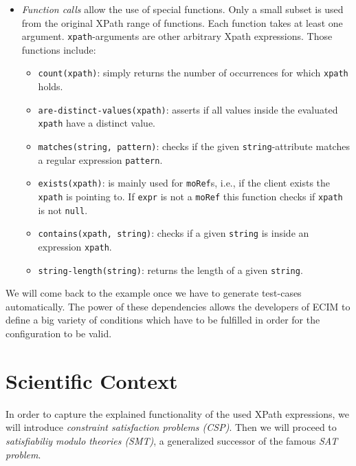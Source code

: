 \begin{itemize}
  \item \emph{Function calls} allow the use of special functions. Only a small subset is used from the original XPath range of functions. Each function takes at least one argument. \verb|xpath|-arguments are other arbitrary Xpath expressions. Those functions include:
  \begin{itemize}
   \item \verb|count(xpath)|: simply returns the number of occurrences for which \verb|xpath| holds.
   
   \item \verb|are-distinct-values(xpath)|: asserts if all values inside the evaluated \verb|xpath| have 
   a distinct value.
   
   \item \verb|matches(string, pattern)|: checks if the given \verb|string|-attribute matches a regular expression \verb|pattern|.
   
   \item \verb|exists(xpath)|: is mainly used for \verb|moRef|s, i.e., if the client exists the \verb|xpath| is pointing to. If \verb|expr| is not a \verb|moRef| this function checks if \verb|xpath| is not \verb|null|.
   
   \item \verb|contains(xpath, string)|: checks if a given \verb|string| is inside an expression \verb|xpath|.
   
   \item \verb|string-length(string)|: returns the length of a given \verb|string|. 
  \end{itemize}
\end{itemize}

We will come back to the example once we have to generate test-cases automatically. The power of these dependencies allows the developers of ECIM to define a big variety of conditions which have to be fulfilled in order for the configuration to be valid. 

\section{Scientific Context}\label{sec:science}

In order to capture the explained functionality of the used XPath expressions, we will introduce \emph{constraint satisfaction problems (CSP)}. Then we will proceed to \emph{satisfiabiliy modulo theories (SMT)}, a generalized successor of the famous \emph{SAT problem}. \\

